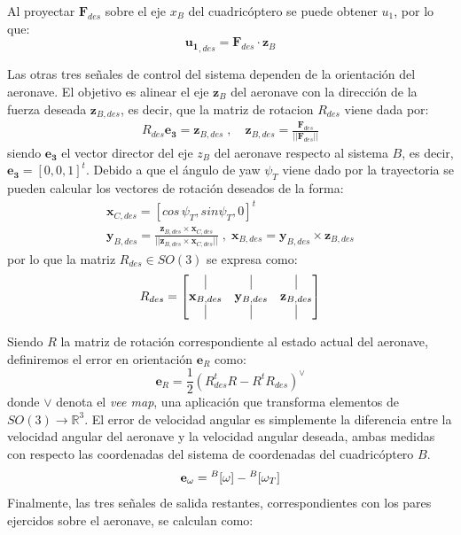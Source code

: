 Al proyectar $\mathbf{F}_{des}$ sobre el eje $x_B$ del cuadricóptero se puede obtener $u_1$, por lo que:
\begin{equation}
	\mathbf{u_1}_{,des} = \mathbf{F}_{des}\cdot \mathbf{z}_B
\end{equation}

Las otras tres señales de control del sistema dependen de la orientación del aeronave. El objetivo es alinear el eje $\mathbf{z}_B$ del aeronave con la dirección de la fuerza deseada $\mathbf{z}_{B,des}$, es decir, que la matriz de rotacion $R_{des}$ viene dada por:
\begin{align}	
	R_{des}\mathbf{e_3} = \mathbf{z}_{B,des}\;,\quad 
\mathbf{z}_{B,des} = \frac{\mathbf{F}_{des}}{||\mathbf{F}_{des}||}
\end{align}
siendo $\mathbf{e_3}$ el vector director del eje $z_B$ del aeronave respecto al sistema $B$, es decir, $\mathbf{e_3} = [0, 0, 1]^t$.
Debido a que el ángulo de yaw $\psi_T$ viene dado por la trayectoria se pueden calcular los vectores de rotación deseados de la forma:
\begin{gather}
	\mathbf{x}_{C,des} = [cos\, \psi_T , sin \psi_T, 0]^t\\
	\mathbf{y}_{B,des} = \frac{\mathbf{z}_{B,des}\times\mathbf{x}_{C,des}}{||\mathbf{z}_{B,des}\times\mathbf{x}_{C,des}||}\;,\; \mathbf{x}_{B,des} = \mathbf{y}_{B,des} \times\mathbf{z}_{B,des}
\end{gather}
por lo que la matriz $R_{des} \in SO(3)$ se expresa como:
\begin{equation}
	R_{des}=
	\begin{bmatrix}
		\vrule&\vrule&\vrule\\
		\mathbf{x}_{B,des}&\mathbf{y}_{B,des}&\mathbf{z}_{B,des}\\
		\vrule&\vrule&\vrule
	\end{bmatrix}
\end{equation}

Siendo $R$ la matriz de rotación correspondiente al estado actual del aeronave, definiremos el error en orientación $\mathbf{e}_R $ como:
\begin{equation}
	\mathbf{e}_R = \frac{1}{2}\left(R_{des}^t R - R^t R_{des} \right)^\vee
\end{equation}
donde $\vee$ denota el \textit{vee map}, una aplicación que transforma elementos de $SO(3) \rightarrow \mathbb{R}^3$. El error de velocidad angular es simplemente la diferencia entre la velocidad angular del aeronave y la velocidad angular deseada, ambas medidas con respecto las coordenadas del sistema de coordenadas del cuadricóptero $B$.
\begin{equation}
	\mathbf{e}_\omega = \null^B[\omega]-\null^B[\omega_T] 
\end{equation}
Finalmente, las tres señales de salida restantes, correspondientes con los pares ejercidos sobre el aeronave, se calculan como:

